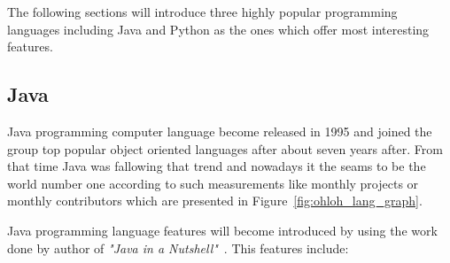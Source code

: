 The following sections will introduce three highly popular programming languages including Java and Python  as the ones which offer most interesting features. 
\subsection{Java}\label{subsec:java}
Java programming computer language become released in 1995 and joined the group top popular object oriented languages after about seven years after. From that time Java was fallowing that trend and nowadays it the seams to be the world number one according to such measurements like monthly projects or monthly contributors which are presented in Figure~\ref{fig:ohloh_lang_graph}.

Java programming language features will become introduced by using the work done by author of \textit{"Java in a Nutshell"}~\cite[pages 4-6]{java_nutshell}. This features include:
